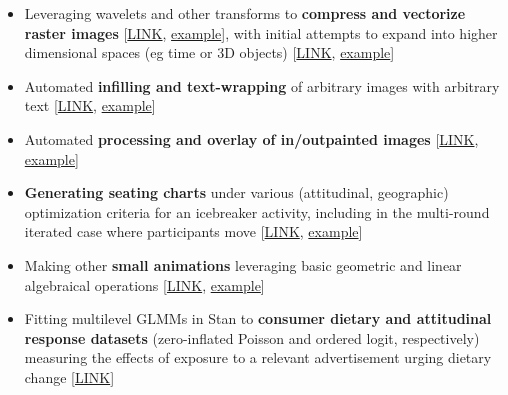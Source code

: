 \documentclass[12pt]{article}
\begin{document}
\begin{itemize}[noitemsep]

\item Leveraging wavelets and other transforms to \textbf{compress and vectorize raster images} [\href{https://github.com/NikVetr/minor_scripts/blob/c8926965b0c6dd9158351cf5836cbc76261f6830/postdoc/vectorize\_raster\_image.R}{LINK}, \href{https://drive.google.com/file/d/1rrEjdL13qZZIi22Pe5IkbUJKjPmpPpP5}{example}], with initial attempts to expand into higher dimensional spaces (eg time or 3D objects) [\href{https://github.com/NikVetr/minor_scripts/blob/c8926965b0c6dd9158351cf5836cbc76261f6830/postdoc/interpolate\_signature\_frequency\_series.R}{LINK}, \href{https://drive.google.com/file/d/1IDgm04h0LEZc4IXOPjqBheifsz2Y6ZmW}{example}]

\item Automated \textbf{infilling and text-wrapping} of arbitrary images with arbitrary text [\href{https://github.com/NikVetr/minor_scripts/blob/c8926965b0c6dd9158351cf5836cbc76261f6830/postdoc/text\_to\_image.R}{LINK}, \href{https://drive.google.com/file/d/1cedbUpq8ArDd4fnjxUZBHlSLuVqsI7UO}{example}]

\item Automated \textbf{processing and overlay of in/outpainted images} [\href{https://github.com/NikVetr/minor_scripts/blob/c8926965b0c6dd9158351cf5836cbc76261f6830/postdoc/dall-e2\_zoomout.R}{LINK}, \href{https://drive.google.com/file/d/1nuvGY8d3h9qYeh9NrWVbo9ybkt0RdORn}{example}]

\item \textbf{Generating seating charts} under various (attitudinal, geographic) optimization criteria for an icebreaker activity, including in the multi-round iterated case where participants move [\href{https://github.com/NikVetr/minor_scripts/blob/c8926965b0c6dd9158351cf5836cbc76261f6830/postdoc/optimal_table_seating.R}{LINK}, \href{https://drive.google.com/file/d/1z-D3m9fd-hYQmAHGoDBl3N--k-udfTLb/view?usp=drive\_link}{example}]

\item Making other \textbf{small animations} leveraging basic geometric and linear algebraical operations [\href{https://github.com/NikVetr/minor_scripts/blob/c8926965b0c6dd9158351cf5836cbc76261f6830/postdoc/polygon\_animation.r}{LINK}, \href{https://drive.google.com/file/d/1BCUmNXSr2ST00JxM32t7qBhQXMZEZERv}{example}]

\item Fitting multilevel GLMMs in Stan to \textbf{consumer dietary and attitudinal response datasets} (zero-inflated Poisson and ordered logit, respectively) measuring the effects of exposure to a relevant advertisement urging dietary change [\href{https://github.com/NikVetr/side\_projects/blob/24f7e38876a95433364123441f9b41d260105be6/MFA_Ads.R}{LINK}]


\end{itemize}
\end{document}
